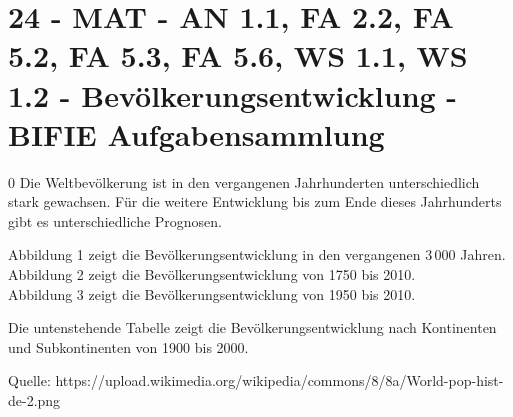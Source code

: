 \section{24 - MAT - AN 1.1, FA 2.2, FA 5.2, FA 5.3, FA 5.6, WS 1.1, WS 1.2 - Bevölkerungsentwicklung - BIFIE Aufgabensammlung}

\begin{langesbeispiel} \item[0] %
				Die Weltbevölkerung ist in den vergangenen Jahrhunderten unterschiedlich stark gewachsen. Für die weitere Entwicklung bis zum Ende dieses Jahrhunderts gibt es unterschiedliche Prognosen.
				
				Abbildung 1 zeigt die Bevölkerungsentwicklung in den vergangenen 3\,000 Jahren.\\			
				Abbildung 2 zeigt die Bevölkerungsentwicklung von 1750 bis 2010.\\				
				Abbildung 3 zeigt die Bevölkerungsentwicklung von 1950 bis 2010.
				
				Die untenstehende Tabelle zeigt die Bevölkerungsentwicklung nach Kontinenten und Subkontinenten von 1900 bis 2000.
				
				\begin{center}
				\begin{tiny}Quelle: https://upload.wikimedia.org/wikipedia/commons/8/8a/World-pop-hist-de-2.png\end{tiny}
								

\end{center}
\end{langesbeispiel}
